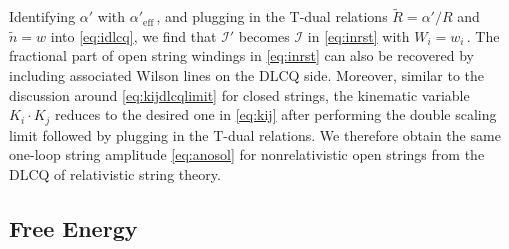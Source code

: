 \documentclass[11pt]{article}
\newcommand{\CI}{\mathcal{I}}
\renewcommand{\tilde}[1]{\widetilde{#1}}
\begin{document}
Identifying $\alpha'$ with $\alpha'_\text{eff}$\,, and plugging in the T-dual relations $\tilde{R} = \alpha' / R$ and $\tilde{n} = w$ into \eqref{eq:idlcq}, we find that $\CI'$ becomes $\CI$ in \eqref{eq:inrst} with $W_i = w_i$\,. The fractional part of open string windings in \eqref{eq:inrst} can also be recovered by including associated Wilson lines on the DLCQ side. Moreover, similar to the discussion around \eqref{eq:kijdlcqlimit} for closed strings, the kinematic variable $K_i \cdot K_j$ reduces to the desired one in \eqref{eq:kij} after performing the double scaling limit followed by plugging in the T-dual relations. We therefore obtain the same one-loop string amplitude \eqref{eq:anosol} for nonrelativistic open strings from the DLCQ of relativistic string theory. 


\subsection{Free Energy} 
\end{document}
